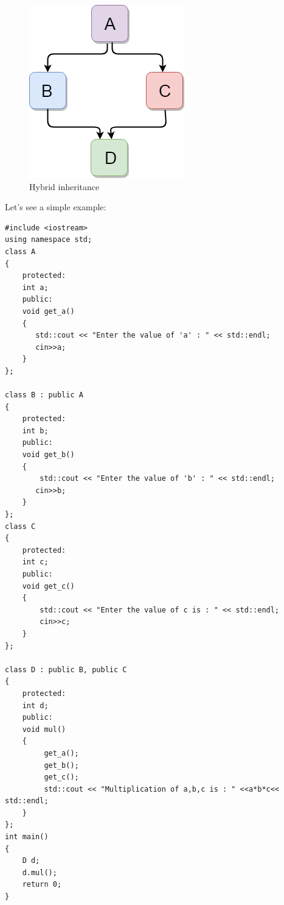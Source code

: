 \documentclass{book}
\begin{document}
\begin{figure}[h]
\includegraphics[width=\columnwidth]{hybrid-inheritance}%
\caption{Hybrid inheritance}%
\label{}%
\end{figure}

Let's see a simple example:

\begin{lstlisting}
#include <iostream>  
using namespace std;  
class A  
{  
    protected:  
    int a;  
    public:  
    void get_a()  
    {  
       std::cout << "Enter the value of 'a' : " << std::endl;  
       cin>>a;  
    }  
};  
  
class B : public A   
{  
    protected:  
    int b;  
    public:  
    void get_b()  
    {  
        std::cout << "Enter the value of 'b' : " << std::endl;  
       cin>>b;  
    }  
};  
class C   
{  
    protected:  
    int c;  
    public:  
    void get_c()  
    {  
        std::cout << "Enter the value of c is : " << std::endl;  
        cin>>c;  
    }  
};  
  
class D : public B, public C  
{  
    protected:  
    int d;  
    public:  
    void mul()  
    {  
         get_a();  
         get_b();  
         get_c();  
         std::cout << "Multiplication of a,b,c is : " <<a*b*c<< std::endl;  
    }  
};  
int main()  
{  
    D d;  
    d.mul();  
    return 0;  
}  
\end{lstlisting}
\end{document}
